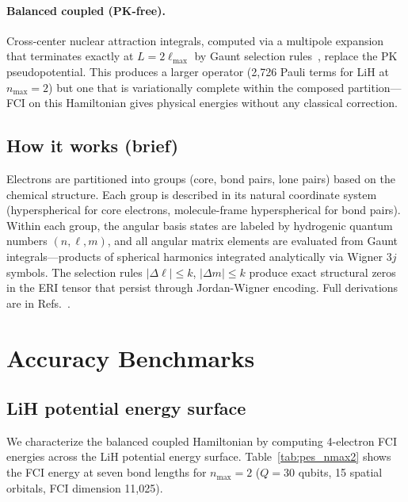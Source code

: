 \documentclass[twocolumn,pra,amsmath,amssymb,superscriptaddress]{revtex4-2}
\newcommand{\gvq}[2]{#2}
\begin{document}
\paragraph{Balanced coupled (PK-free).}
Cross-center nuclear attraction integrals, computed via a multipole
expansion that terminates exactly at $L = 2\ell_{\max}$ by Gaunt
selection rules~\cite{GeoVac_Paper19}, replace the PK pseudopotential.
This produces a larger operator (\gvq{lih_balanced_pauli}{2{,}726} Pauli terms for LiH at
$n_{\max}=2$) but one that is variationally complete within the
composed partition---FCI on this Hamiltonian gives physical energies
without any classical correction.

\subsection{How it works (brief)}

Electrons are partitioned into groups (core, bond pairs, lone pairs)
based on the chemical structure.  Each group is described in its natural
coordinate system (hyperspherical for core electrons, molecule-frame
hyperspherical for bond pairs).  Within each group, the angular basis
states are labeled by hydrogenic quantum numbers $(n, \ell, m)$, and
all angular matrix elements are evaluated from Gaunt integrals---products
of spherical harmonics integrated analytically via Wigner 3$j$ symbols.
The selection rules $|\Delta\ell| \leq k$, $|\Delta m| \leq k$ produce
exact structural zeros in the ERI tensor that persist through
Jordan-Wigner encoding.  Full derivations are in
Refs.~\cite{GeoVac_Paper7,GeoVac_Paper14,GeoVac_Paper17,GeoVac_Paper19}.

\section{Accuracy Benchmarks}
\label{sec:accuracy}

\subsection{LiH potential energy surface}

We characterize the balanced coupled Hamiltonian by computing
4-electron FCI energies across the LiH potential energy surface.
Table~\ref{tab:pes_nmax2} shows the FCI energy at seven bond lengths
for $n_{\max}=2$ ($Q=30$ qubits, 15 spatial orbitals, FCI dimension
11{,}025).
\end{document}
